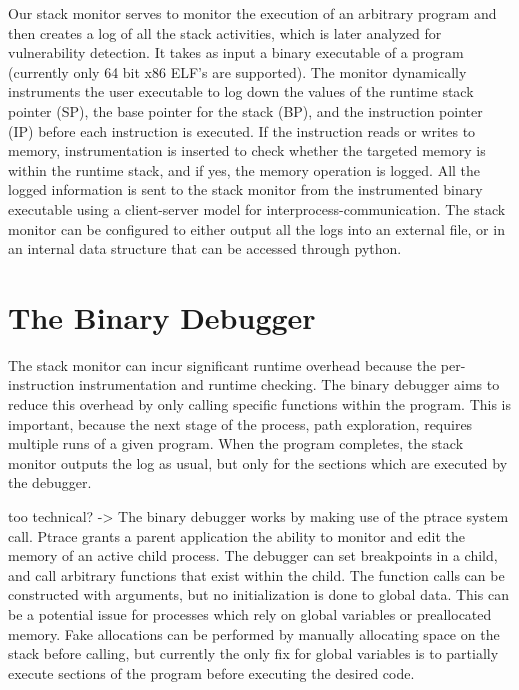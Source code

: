 \documentclass{article}
\begin{document}
Our stack monitor serves to monitor the execution of an arbitrary program and
then creates a log of all the stack activities, which is later analyzed for
vulnerability detection. It takes as input a binary executable of a program
(currently only 64 bit x86 ELF's are supported). The monitor dynamically
instruments the user executable to log down the values of the runtime stack
pointer (SP), the base pointer for the stack (BP), and the instruction pointer
(IP) before each instruction is executed. If the instruction reads or writes to
memory, instrumentation is inserted to check whether the targeted memory is
within the runtime stack, and if yes, the memory operation is logged. All the
logged information is sent to the stack monitor from the instrumented binary
executable using a client-server model for interprocess-communication.
The stack monitor can be configured to either output all the logs into an
external file, or in an internal data structure that can be accessed through
python.


\section{The Binary Debugger}

The stack monitor can incur significant runtime overhead because the
per-instruction instrumentation and runtime checking. The binary debugger aims
to reduce this overhead by only calling specific functions within the program.
This is important, because the next stage of the process, path exploration,
requires multiple runs of a given program. When the program completes, the
stack monitor outputs the log as usual, but only for the sections which are
executed by the debugger.

too technical? ->
The binary debugger works by making use of the ptrace system call. Ptrace
grants a parent application the ability to monitor and edit the memory of an
active child process. The debugger can set breakpoints in a child, and call
arbitrary functions that exist within the child. The function calls can be
constructed with arguments, but no initialization is done to global data. This
can be a potential issue for processes which rely on global variables or
preallocated memory. Fake allocations can be performed by manually allocating
space on the stack before calling, but currently the only fix for global
variables is to partially execute sections of the program before executing the
desired code.
\end{document}
